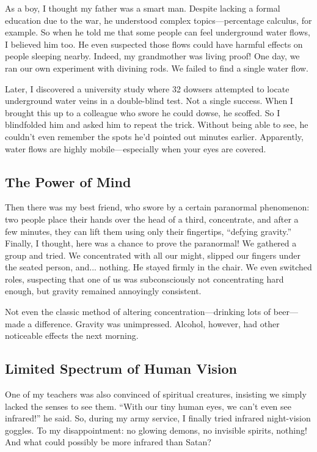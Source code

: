 As a boy, I thought my father was a smart man. Despite lacking a formal education due to the war, he understood complex topics—percentage calculus, for example. So when he told me that some people can feel underground water flows, I believed him too.
He even suspected those flows could have harmful effects on people sleeping nearby. Indeed, my grandmother was living proof! One day, we ran our own experiment with divining rods. We failed to find a single water flow.

Later, I discovered a university study where 32 dowsers attempted to locate underground water veins in a double-blind test. Not a single success. When I brought this up to a colleague who swore he could dowse, he scoffed. So I blindfolded him and asked him to repeat the trick. Without being able to see, he couldn't even remember the spots he’d pointed out minutes earlier. Apparently, water flows are highly mobile—especially when your eyes are covered.


\subsection*{The Power of Mind}

Then there was my best friend, who swore by a certain paranormal phenomenon: two people place their hands over the head of a third, concentrate, and after a few minutes, they can lift them using only their fingertips, ``defying gravity.'' Finally, I thought, here was a chance to prove the paranormal! We gathered a group and tried. We concentrated with all our might, slipped our fingers under the seated person, and... nothing. He stayed firmly in the chair. We even switched roles, suspecting that one of us was subconsciously not concentrating hard enough, but gravity remained annoyingly consistent.

Not even the classic method of altering concentration—drinking lots of beer—made a difference. Gravity was unimpressed. Alcohol, however, had other noticeable effects the next morning.


\subsection*{Limited Spectrum of Human Vision}

One of my teachers was also convinced of spiritual creatures, insisting we simply lacked the senses to see them. ``With our tiny human eyes, we can't even see infrared!'' he said. So, during my army service, I finally tried infrared night-vision goggles. To my disappointment: no glowing demons, no invisible spirits, nothing! And what could possibly be more infrared than Satan?


